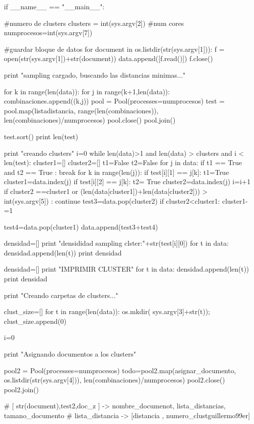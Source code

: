 \begin{python}
    
if __name__ == "__main__":
	
	#numero de clusters
	clusters = int(sys.argv[2])
	#num cores
	numprocesos=int(sys.argv[7])
	
	#guardar bloque de datos 
	for document in os.listdir(str(sys.argv[1])):
		f = open(str(sys.argv[1])+str(document))
		data.append([f.read()])
		f.close()

	print "sampling cargado, buscando las distancias minimas..."
	
	for k in range(len(data)):
			for j in range(k+1,len(data)):
				combinaciones.append((k,j))
	pool = Pool(processes=numprocesos)
	test = pool.map(listadistancia, range(len(combinaciones)), len(combinaciones)/numprocesos)
	pool.close()
	pool.join()

	test.sort()
	print len(test)	
		
	print "creando clusters"
	i=0
	while len(data)>1 and len(data) > clusters and i < len(test):
		cluster1=[]
		cluster2=[]
		t1=False
		t2=False
		for j in data:
			if t1 == True and t2 == True :
				break
			for k in range(len(j)):
				if test[i][1] == j[k]:
					t1=True
					cluster1=data.index(j)
				if test[i][2] == j[k]:
					t2= True
					cluster2=data.index(j)
		i=i+1
		if cluster2 ==cluster1 or (len(data[cluster1])+len(data[cluster2])) > int(sys.argv[5]) : 
			continue
		test3=data.pop(cluster2)		
		if cluster2<cluster1:
			cluster1-=1
				
		test4=data.pop(cluster1)
		data.append(test3+test4)
		
		densidad=[]		
		print "densididad sampling clster:"+str(test[i][0])
		for t in data:
			densidad.append(len(t))
		print densidad
		
	densidad=[]		
	print "IMPRIMIR CLUSTER"
	for t in data:
		densidad.append(len(t))
	print densidad
	
	print "Creando carpetas de clusters..."
	
	clust_size=[]
	for t in range(len(data)):
		os.mkdir( sys.argv[3]+str(t));
		clust_size.append(0)

		
	i=0
	
	print "Asignando documentos a los clusters"
	
	pool2 = Pool(processes=numprocesos)
	todo=pool2.map(asignar_documento, os.listdir(str(sys.argv[4])), len(combinaciones)/numprocesos)
	pool2.close()
	pool2.join()
	
	# [ str(document),test2,doc_z ] -> nombre_documenot, lista_distancias, tamano_documento
	# lista_distancia -> [distancia , numero_clustguillermo99er]
	

\end{python}
